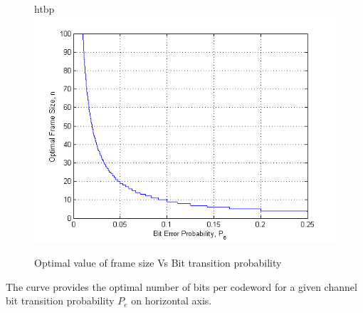 \begin{figure}{htbp}
	\centering
	\includegraphics[width=\textwidth]{./Figures/OptimalFunction.png}
	\caption{Optimal value of frame size Vs Bit transition probability}
	\label{fig:optimal_function}
\end{figure}
The curve provides the optimal number of bits per codeword for a given channel bit transition probability $P_e$ on horizontal axis.

